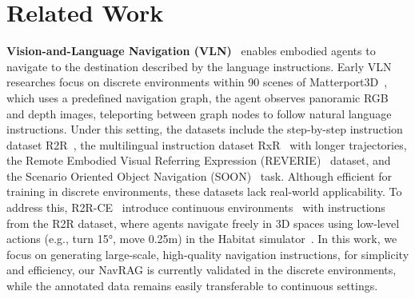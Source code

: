 \section{Related Work}
\noindent \textbf{Vision-and-Language Navigation (VLN)}~\cite{anderson2018vision,krantz2020beyond,qi2020reverie,zhu2021soon} enables embodied agents to navigate to the destination described by the language instructions.
Early VLN researches focus on discrete environments within 90 scenes of Matterport3D~\cite{chang2017matterport3d}, which uses a predefined navigation graph, the agent observes panoramic RGB and depth images, teleporting between graph nodes to follow natural language instructions. Under this setting, the datasets include the step-by-step instruction dataset R2R~\cite{anderson2018vision},  the multilingual instruction dataset RxR~\cite{ku2020room} with longer trajectories, the Remote Embodied Visual Referring Expression (REVERIE)~\cite{qi2020reverie} dataset, and the Scenario Oriented Object Navigation (SOON)~\cite{zhu2021soon} task.
Although efficient for training in discrete environments, these datasets lack real-world applicability. To address this, R2R-CE~\cite{krantz2020beyond} introduce continuous environments~\cite{savva2019habitat} with instructions from the R2R dataset, where agents navigate freely in 3D spaces using low-level actions (e.g., turn 15°, move 0.25m) in the Habitat simulator~\cite{savva2019habitat}. %
In this work, we focus on generating large-scale, high-quality navigation instructions, for simplicity and efficiency, our NavRAG is currently validated in the discrete environments, while the annotated data remains easily transferable to continuous settings.

